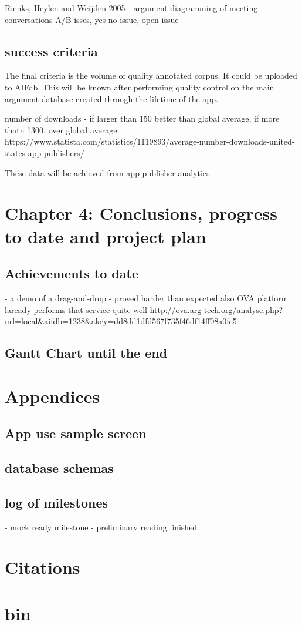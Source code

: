 \documentclass{article}
\begin{document}
Rienks, Heylen and Weijden 2005 - argument diagramming of meeting conversations
A/B isses, yes-no issue, open issue

\subsection{success criteria}
The final criteria is the volume of quality annotated corpus. It could be uploaded to AIFdb. 
This will be known after performing quality control on the main argument database created through the lifetime of the app. 

number of downloads - if larger than 150 better than global average, if more thatn 1300, over global average.
https://www.statista.com/statistics/1119893/average-number-downloads-united-states-app-publishers/

These data will be achieved from app publisher analytics.


\section{Chapter 4: Conclusions, progress to date and project plan}
\subsection{Achievements to date}
- a demo of a drag-and-drop - proved harder than expected
also OVA platform laready performs that service quite well
http://ova.arg-tech.org/analyse.php?url=local&aifdb=1238&akey=dd8dd1dfd567f735f46df14ff08a0fc5

\subsection{Gantt Chart until the end}

\section{Appendices}
\subsection{App use sample screen}

\subsection{database schemas}

\subsection{log of milestones}
- mock ready milestone 
- preliminary reading finished

\section{Citations}
\newpage

\section{bin}
\end{document}
